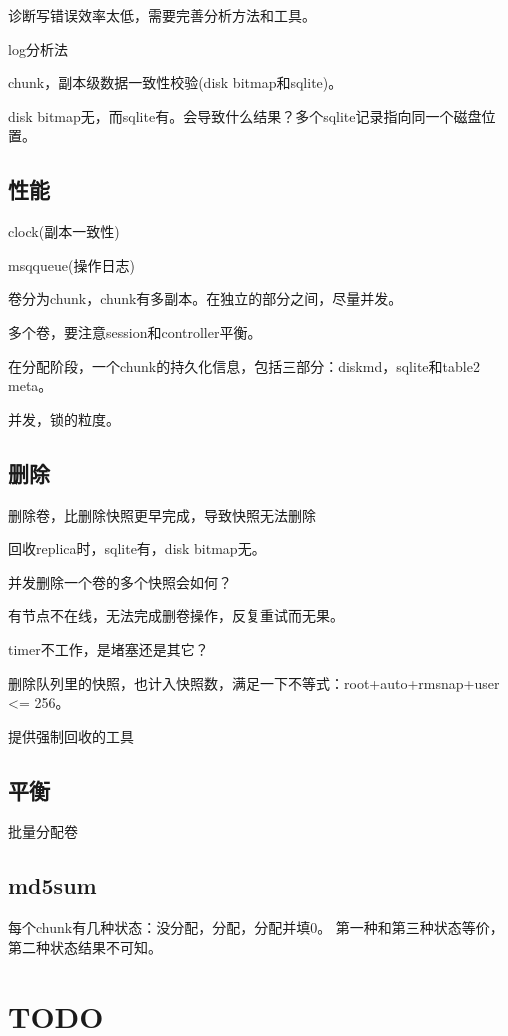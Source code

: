 诊断写错误效率太低，需要完善分析方法和工具。

log分析法

chunk，副本级数据一致性校验(disk bitmap和sqlite)。

disk bitmap无，而sqlite有。会导致什么结果？多个sqlite记录指向同一个磁盘位置。

\subsection{性能}

clock(副本一致性)

msqqueue(操作日志)

卷分为chunk，chunk有多副本。在独立的部分之间，尽量并发。

多个卷，要注意session和controller平衡。

在分配阶段，一个chunk的持久化信息，包括三部分：diskmd，sqlite和table2 meta。

并发，锁的粒度。

\subsection{删除}

删除卷，比删除快照更早完成，导致快照无法删除

回收replica时，sqlite有，disk bitmap无。

并发删除一个卷的多个快照会如何？

有节点不在线，无法完成删卷操作，反复重试而无果。

timer不工作，是堵塞还是其它？

删除队列里的快照，也计入快照数，满足一下不等式：root+auto+rmsnap+user <= 256。

提供强制回收的工具

\subsection{平衡}

批量分配卷

\subsection{md5sum}

每个chunk有几种状态：没分配，分配，分配并填0。
第一种和第三种状态等价，第二种状态结果不可知。

\section{TODO}

